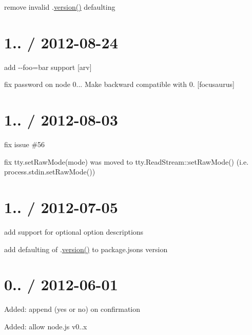 \begin{DoxyItemize}
\item remove invalid .\mbox{\hyperlink{namespacesetup_a2aa722b36a933088812b50ea79b97a5c}{version()}} defaulting
\end{DoxyItemize}

\section*{1.. / 2012-\/08-\/24 }


\begin{DoxyItemize}
\item add {\ttfamily -\/-\/foo=bar} support \mbox{[}arv\mbox{]}
\item fix password on node 0... Make backward compatible with 0. \mbox{[}focusaurus\mbox{]}
\end{DoxyItemize}

\section*{1.. / 2012-\/08-\/03 }


\begin{DoxyItemize}
\item fix issue \#56
\item fix tty.\+set\+Raw\+Mode(mode) was moved to tty.\+Read\+Stream\+::set\+Raw\+Mode() (i.\+e. process.\+stdin.\+set\+Raw\+Mode())
\end{DoxyItemize}

\section*{1.. / 2012-\/07-\/05 }


\begin{DoxyItemize}
\item add support for optional option descriptions
\item add defaulting of {\ttfamily .\mbox{\hyperlink{namespacesetup_a2aa722b36a933088812b50ea79b97a5c}{version()}}} to package.\+json\textquotesingle{}s version
\end{DoxyItemize}

\section*{0.. / 2012-\/06-\/01 }


\begin{DoxyItemize}
\item Added\+: append (yes or no) on confirmation
\item Added\+: allow node.\+js v0..\+x
\end{DoxyItemize}

